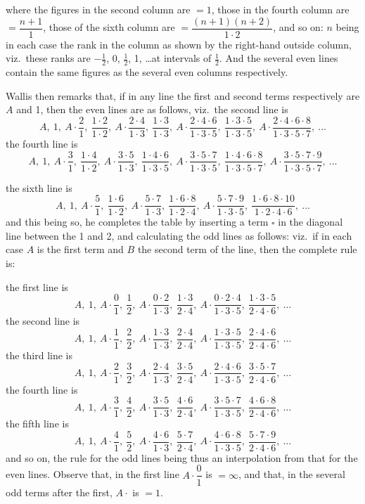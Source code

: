 \documentclass[11pt,a4paper]{article}
\begin{document}
where the figures in the second column are $= 1$, those in the fourth column are $= \dfrac{n + 1}{1}$, those of the sixth column are $= \dfrac{(n + 1)(n + 2)}{1 \cdot 2}$, and so on: $n$ being in each case the rank in the column as shown by the right-hand outside column, viz.\ these ranks are $-\tfrac{1}{2}$, 0, $\tfrac{1}{2}$, 1, \ldots at intervals of $\tfrac{1}{2}$. And the several even lines contain the same figures as the several even columns respectively.

\smallskip
Wallis then remarks that, if in any line the first and second terms respectively are $A$ and 1, then the even lines are as follows, viz.\ the second line is
\[
A,\ 1,\ A\cdot\frac{2}{1},\ \frac{1\cdot 2}{1\cdot 2},\ A\cdot\frac{2\cdot 4}{1\cdot 3},\ \frac{1\cdot 3}{1\cdot 3},\ A\cdot\frac{2\cdot 4\cdot 6}{1\cdot 3\cdot 5},\ \frac{1\cdot 3\cdot 5}{1\cdot 3\cdot 5},\ A\cdot\frac{2\cdot 4\cdot 6\cdot 8}{1\cdot 3\cdot 5\cdot 7},\ \ldots
\]
the fourth line is
\[
A,\ 1,\ A\cdot\frac{3}{1},\ \frac{1\cdot 4}{1\cdot 2},\ A\cdot\frac{3\cdot 5}{1\cdot 3},\ \frac{1\cdot 4\cdot 6}{1\cdot 3\cdot 5},\ A\cdot\frac{3\cdot 5\cdot 7}{1\cdot 3\cdot 5},\ \frac{1\cdot 4\cdot 6\cdot 8}{1\cdot 3\cdot 5\cdot 7},\ A\cdot\frac{3\cdot 5\cdot 7\cdot 9}{1\cdot 3\cdot 5\cdot 7},\ \ldots
\]

\newpage

the sixth line is
\[
A,\ 1,\ A\cdot\frac{5}{1},\ \frac{1\cdot 6}{1\cdot 2},\ A\cdot\frac{5\cdot 7}{1\cdot 3},\ \frac{1\cdot 6\cdot 8}{1\cdot 2\cdot 4},\ A\cdot\frac{5\cdot 7\cdot 9}{1\cdot 3\cdot 5},\ \frac{1\cdot 6\cdot 8\cdot 10}{1\cdot 2\cdot 4\cdot 6},\ \ldots
\]
and this being so, he completes the table by inserting a term $\square$ in the diagonal line between the 1 and 2, and calculating the odd lines as follows: viz.\ if in each case $A$ is the first term and $B$ the second term of the line, then the complete rule is:

\smallskip
the first line is
\[
A,\ 1,\ A\cdot\frac{0}{1},\ \frac{1}{2},\ A\cdot\frac{0\cdot 2}{1\cdot 3},\ \frac{1\cdot 3}{2\cdot 4},\ A\cdot\frac{0\cdot 2\cdot 4}{1\cdot 3\cdot 5},\ \frac{1\cdot 3\cdot 5}{2\cdot 4\cdot 6},\ \ldots
\]
the second line is
\[
A,\ 1,\ A\cdot\frac{1}{1},\ \frac{2}{2},\ A\cdot\frac{1\cdot 3}{1\cdot 3},\ \frac{2\cdot 4}{2\cdot 4},\ A\cdot\frac{1\cdot 3\cdot 5}{1\cdot 3\cdot 5},\ \frac{2\cdot 4\cdot 6}{2\cdot 4\cdot 6},\ \ldots
\]
the third line is
\[
A,\ 1,\ A\cdot\frac{2}{1},\ \frac{3}{2},\ A\cdot\frac{2\cdot 4}{1\cdot 3},\ \frac{3\cdot 5}{2\cdot 4},\ A\cdot\frac{2\cdot 4\cdot 6}{1\cdot 3\cdot 5},\ \frac{3\cdot 5\cdot 7}{2\cdot 4\cdot 6},\ \ldots
\]
the fourth line is
\[
A,\ 1,\ A\cdot\frac{3}{1},\ \frac{4}{2},\ A\cdot\frac{3\cdot 5}{1\cdot 3},\ \frac{4\cdot 6}{2\cdot 4},\ A\cdot\frac{3\cdot 5\cdot 7}{1\cdot 3\cdot 5},\ \frac{4\cdot 6\cdot 8}{2\cdot 4\cdot 6},\ \ldots
\]
the fifth line is
\[
A,\ 1,\ A\cdot\frac{4}{1},\ \frac{5}{2},\ A\cdot\frac{4\cdot 6}{1\cdot 3},\ \frac{5\cdot 7}{2\cdot 4},\ A\cdot\frac{4\cdot 6\cdot 8}{1\cdot 3\cdot 5},\ \frac{5\cdot 7\cdot 9}{2\cdot 4\cdot 6},\ \ldots
\]
and so on, the rule for the odd lines being thus an interpolation from that for the even lines. Observe that, in the first line $A\cdot\dfrac{0}{1}$ is $= \infty$, and that, in the several odd terms after the first, $A\cdot$ is $= 1$.
\end{document}
